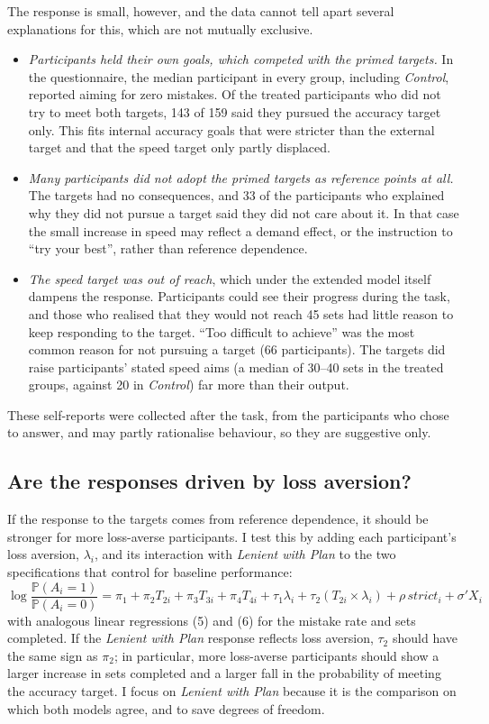\documentclass[12pt, letterpaper]{article}
\newcommand{\CtrlName}{Control}
\newcommand{\LPName}{Lenient with Plan}
\newcommand{\Ctrl}{\textit{\CtrlName}}
\newcommand{\LP}{\textit{\LPName}}
\begin{document}
The response is small, however, and the data cannot tell apart several explanations for this, which are not mutually exclusive.
\begin{itemize}
\item \emph{Participants held their own goals, which competed with the primed targets.} In the questionnaire, the median participant in every group, including \Ctrl{}, reported aiming for zero mistakes. Of the treated participants who did not try to meet both targets, 143 of 159 said they pursued the accuracy target only. This fits internal accuracy goals that were stricter than the external target and that the speed target only partly displaced.
\item \emph{Many participants did not adopt the primed targets as reference points at all.} The targets had no consequences, and 33 of the participants who explained why they did not pursue a target said they did not care about it. In that case the small increase in speed may reflect a demand effect, or the instruction to ``try your best'', rather than reference dependence.
\item \emph{The speed target was out of reach}, which under the extended model itself dampens the response. Participants could see their progress during the task, and those who realised that they would not reach 45 sets had little reason to keep responding to the target. ``Too difficult to achieve'' was the most common reason for not pursuing a target (66 participants). The targets did raise participants' stated speed aims (a median of 30--40 sets in the treated groups, against 20 in \Ctrl{}) far more than their output.
\end{itemize}
These self-reports were collected after the task, from the participants who chose to answer, and may partly rationalise behaviour, so they are suggestive only.%

\subsection{Are the responses driven by loss aversion?}

If the response to the targets comes from reference dependence, it should be stronger for more loss-averse participants. I test this by adding each participant's loss aversion, $\lambda_i$, and its interaction with \LP{} to the two specifications that control for baseline performance:
\[
\log \frac{\mathbb{P}(A_i = 1)}{\mathbb{P}(A_i = 0)} = \pi_1 + \pi_2 T_{2i} + \pi_3 T_{3i} + \pi_4 T_{4i} + \tau_1 \lambda_i + \tau_2(T_{2i} \times \lambda_i) + \rho\, strict_i + \sigma' X_i \tag{4}
\]
with analogous linear regressions (5) and (6) for the mistake rate and sets completed. If the \LP{} response reflects loss aversion, $\tau_2$ should have the same sign as $\pi_2$; in particular, more loss-averse participants should show a larger increase in sets completed and a larger fall in the probability of meeting the accuracy target. I focus on \LP{} because it is the comparison on which both models agree, and to save degrees of freedom.
\end{document}
